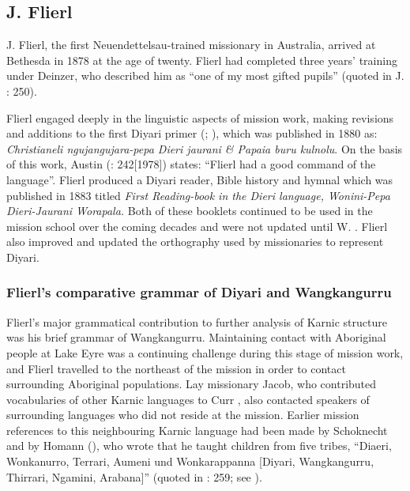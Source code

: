 \subsection{J. Flierl}
\label{sec:key:8.4.1}\label{bkm:Ref514690075}

J. Flierl, the first Neuendettelsau-trained missionary in Australia, arrived at Bethesda in 1878 at the age of twenty. Flierl had completed three years' training under Deinzer, who described him as “one of my most gifted pupils” (quoted in J. \citealt{strehlow_tale_2011}: 250).

Flierl engaged deeply in the linguistic aspects of mission work, making revisions and additions to the first Diyari primer (\citealt{koch_nujanujarajinkiniexa_1870}; ), which was published in 1880 as: \textit{Christianeli ngujangujara-pepa Dieri jaurani \& Papaia buru kulnolu}. On the basis of this work, Austin (\citeyear{austin_grammar_2013}: 242[1978]) states: “Flierl had a good command of the language”. Flierl produced a Diyari reader, Bible history and hymnal which was published in 1883 titled \textit{First Reading-book in the Dieri language, Wonini-Pepa Dieri-Jaurani Worapala.} Both of these booklets continued to be used in the mission school over the coming decades and were not updated until W. \citet{riedel_ngujangujara_1914}. Flierl also improved and updated the orthography used by missionaries to represent Diyari.

\subsubsection{Flierl’s comparative grammar of Diyari and Wangkangurru \citeyearpar{flierl_christianieli_1880}}
\label{sec:key:8.4.1.1}\label{bkm:Ref335827551}

Flierl’s major grammatical contribution to further analysis of Karnic structure was his brief grammar of Wangkangurru. Maintaining contact with Aboriginal people at Lake Eyre was a continuing challenge during this stage of mission work, and Flierl travelled to the northeast of the mission in order to contact surrounding Aboriginal populations. Lay missionary Jacob, who contributed vocabularies of other Karnic languages to Curr \citep{Jacobs1886a,Jacobs1886b,Jacobs1886c}, also contacted speakers of surrounding languages who did not reside at the mission. Earlier mission references to this neighbouring Karnic language had been made by Schoknecht \citep[19]{hercus_grammar_1994} and by Homann (\citealt{homann1868}), who wrote that he taught children from five tribes, “Diaeri, Wonkanurro, Terrari, Aumeni und Wonkarappanna [Diyari, Wangkangurru, Thirrari, Ngamini, Arabana]” (quoted in \citealt{harms_traume_2003}: 259; see ).


